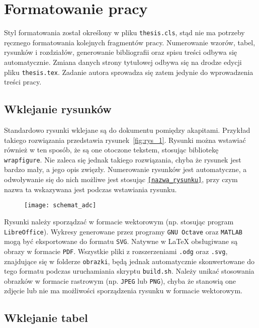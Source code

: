 \chapter{Formatowanie pracy}

Styl formatowania został określony w pliku \texttt{thesis.cls}, stąd nie ma potrzeby ręcznego formatowania kolejnych fragmentów pracy. Numerowanie wzorów, tabel, rysunków i rozdziałów, generowanie bibliografii oraz spisu treści odbywa się automatycznie. Zmiana danych strony tytułowej odbywa się na drodze edycji pliku \texttt{thesis.tex}. Zadanie autora sprowadza się zatem jedynie do wprowadzenia treści pracy.

\section{Wklejanie rysunków}

Standardowo rysunki wklejane są do dokumentu pomiędzy akapitami. Przykład takiego rozwiązania przedstawia rysunek~\ref{fig:rys_1}. Rysunki można wstawiać również w ten sposób, że są one otoczone tekstem, stosując bibliotekę \texttt{wrapfigure}. Nie zaleca się jednak takiego rozwiązania, chyba że rysunek jest bardzo mały, a jego opis zwięzły. Numerowanie rysunków jest automatyczne, a odwoływanie się do nich możliwe jest stosując \texttt{\ref{nazwa_rysunku}}, przy czym nazwa ta wskazywana jest podczas wstawiania rysunku.

\begin{figure}[htb!]
\texttt{[image: schemat\_adc]}
\end{figure}

Rysunki należy sporządzać w formacie wektorowym (np. stosując program \texttt{LibreOffice}). Wykresy generowane przez programy \texttt{GNU Octave} oraz \texttt{MATLAB} mogą być eksportowane do formatu \texttt{SVG}. Natywne w \LaTeX{} obsługiwane są obrazy w formacie \texttt{PDF}. Wszystkie pliki z rozszerzeniami \texttt{.odg} oraz \texttt{.svg}, znajdujące się w folderze \texttt{obrazki}, będą jednak automatycznie skonwertowane do tego formatu podczas uruchamiania skryptu \texttt{build.sh}. Należy unikać stosowania obrazków w formacie rastrowym (np. \texttt{JPEG} lub \texttt{PNG}), chyba że stanowią one zdjęcie lub nie ma możliwości sporządzenia rysunku w formacie wektorowym.

\section{Wklejanie tabel}

